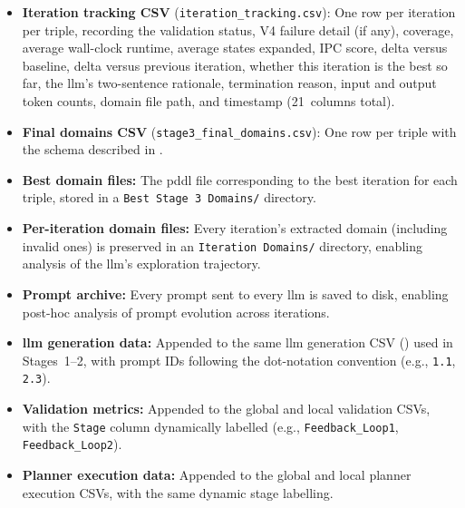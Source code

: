 \begin{itemize}
  \item \textbf{Iteration tracking CSV} (\texttt{iteration\_tracking.csv}):
        One row per iteration per triple, recording the validation status, V4 failure detail (if any), coverage, average wall-clock runtime, average states expanded, IPC score, delta versus baseline, delta versus previous iteration, whether this iteration is the best so far, the \gls{llm}'s two-sentence rationale, termination reason, input and output token counts, domain file path, and timestamp (21~columns total).

  \item \textbf{Final domains CSV} (\texttt{stage3\_final\_domains.csv}):
        One row per triple with the schema described in .

  \item \textbf{Best domain files:}
        The \gls{pddl} file corresponding to the best iteration for each triple, stored in a \texttt{Best Stage~3 Domains/} directory.

  \item \textbf{Per-iteration domain files:}
        Every iteration's extracted domain (including invalid ones) is preserved in an \texttt{Iteration Domains/} directory, enabling analysis of the \gls{llm}'s exploration trajectory.

  \item \textbf{Prompt archive:}
        Every prompt sent to every \gls{llm} is saved to disk, enabling post-hoc analysis of prompt evolution across iterations.

  \item \textbf{\gls{llm} generation data:}
        Appended to the same \gls{llm} generation CSV () used in Stages~1--2, with prompt IDs following the dot-notation convention (e.g., \texttt{1.1}, \texttt{2.3}).

  \item \textbf{Validation metrics:}
        Appended to the global and local validation CSVs, with the \texttt{Stage} column dynamically labelled (e.g., \texttt{Feedback\_Loop1}, \texttt{Feedback\_Loop2}).

  \item \textbf{Planner execution data:}
        Appended to the global and local planner execution CSVs, with the same dynamic stage labelling.
\end{itemize}


